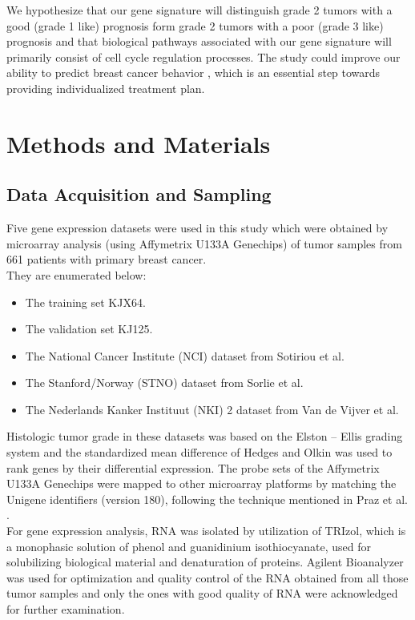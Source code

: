 \documentclass[a4paper,10pt]{article}
\begin{document}
We hypothesize that our gene signature will distinguish grade 2 tumors with a good (grade 1 like) 
prognosis form grade 2 tumors with a poor (grade 3 like) prognosis and that biological pathways 
associated with our gene signature will primarily consist of cell cycle regulation processes.  
The study could improve our ability to predict breast cancer behavior , which is an essential step towards providing 
individualized treatment  plan.\\

\section{Methods and Materials}
\subsection{Data Acquisition and Sampling}


Five gene expression datasets were used in this study which were obtained by
 microarray analysis (using  Affymetrix U133A Genechips) of tumor samples
 from 661 patients with primary breast cancer. \\
They are enumerated below:\\
\begin{itemize}
 \item The training set KJX64.
 \item The validation set KJ125.
 \item The National Cancer Institute (NCI) dataset from Sotiriou et al. \cite{Sotiriou1}
 \item The Stanford/Norway (STNO) dataset from Sorlie et al. \cite{Sorlie1}
 \item The Nederlands Kanker Instituut (NKI) 2 dataset from Van de Vijver et al. \cite{Vijver1}
\end{itemize}

Histologic tumor grade in these datasets was based on the Elston – 
Ellis grading system \cite{Elston1} and the standardized mean difference of Hedges 
and Olkin \cite{Hedges1} was used to rank genes by their differential expression. The probe 
sets of the Affymetrix U133A Genechips were mapped to other microarray platforms
 by matching the Unigene identifiers (version 180), following the technique mentioned 
in Praz et al. \cite{Cleanex}.\\
For gene expression analysis, RNA was isolated by utilization of TRIzol, which 
is a monophasic solution of phenol and guanidinium isothiocyanate, used for 
solubilizing biological material and denaturation of proteins. Agilent Bioanalyzer 
was used for optimization and quality control of the RNA obtained from all those
 tumor samples and only the ones with good quality of RNA were acknowledged 
for further examination.\\
\end{document}
